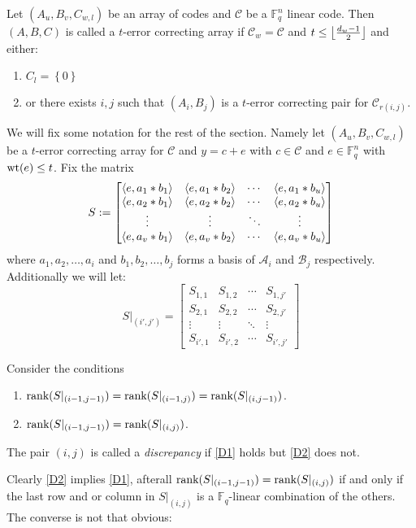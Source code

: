 \begin{definition}
  Let $(A_{u}, B_v, C_{w, l})$ be an array of codes and $\mathcal{C}$ be a $\mathbb{F}_q^n$ linear code. Then $(A, B, C)$ is called a $t$-error correcting array if $\mathcal{C}_w = \mathcal{C}$ and $t \leq \left\lfloor\frac{d_{w} - 1}{2}\right\rfloor$ and either:
  \begin{enumerate}
    \item $C_l = \left\{0\right\}$
    \item or there exists $i, j$ such that $(A_{i}, B_j)$ is a $t$-error correcting pair for $\mathcal{C}_{r(i, j)}$.
  \end{enumerate}
\end{definition}
We will fix some notation for the rest of the section.
Namely let $(A_u, B_v,C_{w, l})$ be a $t$-error correcting array for $\mathcal{C}$ and $y = c + e$ with $c \in \mathcal{C}$ and $e \in \mathbb{F}_q^n$ with $\mathrm{wt}(e) \leq t$. Fix the matrix
\begin{equation*}
    S := \begin{bmatrix}
\langle e, a_1 * b_1\rangle & \langle e, a_1 * b_2\rangle & \cdots & \langle e, a_1 * b_u\rangle \\
\langle e, a_2 * b_1\rangle & \langle e, a_2 * b_2\rangle & \cdots & \langle e, a_2 * b_u\rangle \\
\vdots & \vdots & \ddots & \vdots \\
\langle e, a_v * b_1\rangle & \langle e, a_v * b_2\rangle & \cdots & \langle e, a_v * b_u\rangle \\
        \end{bmatrix}
\end{equation*}
where $a_1, a_2, \ldots, a_{i}$ and $b_1, b_2, \ldots, b_{j}$ forms a basis of $\mathcal{A}_i$ and $\mathcal{B}_j$ respectively. Additionally we will let:
\begin{equation*}
  S \vert_{(i', j')} = \begin{bmatrix}
S_{1, 1} & S_{1, 2} & \cdots & S_{1, j'} \\
S_{2, 1} & S_{2, 2} & \cdots & S_{2, j'} \\
\vdots & \vdots & \ddots & \vdots \\
S_{i', 1} & S_{i', 2} & \cdots & S_{i', j'}
              \end{bmatrix}
\end{equation*}

\begin{definition}
  Consider the conditions
  \begin{enumerate}[label=(D\arabic*), leftmargin=*]
    \item $\textnormal{rank}(S \vert_{(i - 1, j - 1)}) = \textnormal{rank}(S \vert_{(i - 1, j)}) = \textnormal{rank}(S \vert_{(i, j -1)})$. \label{D1}
    \item $\textnormal{rank}(S \vert_{(i - 1, j - 1)}) = \textnormal{rank}(S \vert_{(i, j)})$. \label{D2}
  \end{enumerate}
  The pair $(i, j)$ is called a \textit{discrepancy} if \ref{D1} holds but \ref{D2} does not.
\end{definition}
Clearly \ref{D2} implies \ref{D1}, afterall $\textnormal{rank}(S \vert_{(i - 1, j - 1)}) = \textnormal{rank}(S \vert_{(i, j)})$ if and only if the last row and or column in $S \vert_{(i, j)}$ is a $\mathbb{F}_q$-linear combination of the others. The converse is not that obvious:

